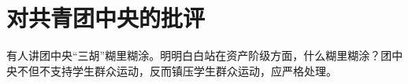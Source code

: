 \section[对共青团中央的批评（一九六六年七月）]{对共青团中央的批评}


有人讲团中央“三胡”糊里糊涂。明明白白站在资产阶级方面，什么糊里糊涂？团中央不但不支持学生群众运动，反而镇压学生群众运动，应严格处理。


